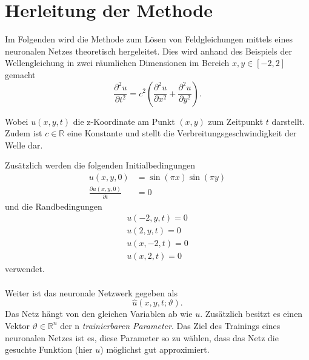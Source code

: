 %
%
%
%

\section{Herleitung der Methode\label{neuronal:section:herleitung}}

Im Folgenden wird die Methode zum Lösen von Feldgleichungen mittels eines neuronalen Netzes theoretisch hergeleitet.
Dies wird anhand des Beispiels der Wellengleichung in zwei räumlichen Dimensionen im Bereich \( x, y \in [-2,2] \) gemacht
\begin{equation}
    \frac{\partial^2 u}{\partial t^2} = c^2 \left( \frac{\partial^2 u}{\partial x^2} + \frac{\partial^2 u}{\partial y^2} \right).
    \label{neuronal:wellengleichung}
\end{equation}

Wobei \( u(x, y, t) \) die z-Koordinate am Punkt \( (x, y) \) zum Zeitpunkt \( t \) darstellt. 
Zudem ist \( c \in \mathbb{R} \) eine Konstante und stellt die Verbreitungsgeschwindigkeit der Welle dar.

Zusätzlich werden die folgenden Initialbedingungen
\begin{equation}
    \begin{aligned}
        u(x, y, 0) &= \sin(\pi x) \sin(\pi y)\\
        \frac{\partial u(x, y, 0)}{\partial t} &= 0
    \end{aligned}
    \label{neuronal:initial}
\end{equation}
und die Randbedingungen
\begin{equation}
    \begin{aligned}
        u(-2, y, t) = 0\\
        u(2, y, t) = 0\\
        u(x, -2, t) = 0\\
        u(x, 2, t) = 0
    \end{aligned}
    \label{neuronal:rand}
\end{equation}
verwendet.\\
\\
Weiter ist das neuronale Netzwerk gegeben als
\begin{equation}
    \hat{u}(x, y, t; \vartheta).
    \label{neuronal:nn}
\end{equation}
Das Netz hängt von den gleichen Variablen ab wie \( u \).
Zusätzlich besitzt es einen Vektor \( \vartheta \in \mathbb{R}^n \) der n \emph{trainierbaren Parameter}.
Das Ziel des Trainings eines neuronalen Netzes ist es, diese Parameter so zu wählen, dass das Netz die gesuchte Funktion (hier \( u \)) möglichst gut approximiert.


